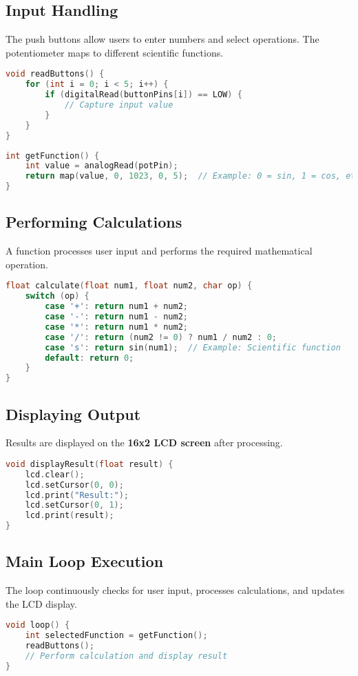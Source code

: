 \documentclass[journal,12pt,onecolumn,article]{IEEEtran}
\theoremstyle{remark}
\begin{document}
\subsection{Input Handling}
The push buttons allow users to enter numbers and select operations. The potentiometer maps to different scientific functions.
\begin{lstlisting}[language=C++, caption=Reading Button Input]
void readButtons() {
    for (int i = 0; i < 5; i++) {
        if (digitalRead(buttonPins[i]) == LOW) {
            // Capture input value
        }
    }
}
\end{lstlisting}

\begin{lstlisting}[language=C++, caption=Mapping Potentiometer Input]
int getFunction() {
    int value = analogRead(potPin);
    return map(value, 0, 1023, 0, 5);  // Example: 0 = sin, 1 = cos, etc.
}
\end{lstlisting}

\subsection{Performing Calculations}
A function processes user input and performs the required mathematical operation.
\begin{lstlisting}[language=C++, caption=Calculation Function]
float calculate(float num1, float num2, char op) {
    switch (op) {
        case '+': return num1 + num2;
        case '-': return num1 - num2;
        case '*': return num1 * num2;
        case '/': return (num2 != 0) ? num1 / num2 : 0;
        case 's': return sin(num1);  // Example: Scientific function
        default: return 0;
    }
}
\end{lstlisting}

\subsection{Displaying Output}
Results are displayed on the \textbf{16x2 LCD screen} after processing.
\begin{lstlisting}[language=C++, caption=LCD Output Display]
void displayResult(float result) {
    lcd.clear();
    lcd.setCursor(0, 0);
    lcd.print("Result:");
    lcd.setCursor(0, 1);
    lcd.print(result);
}
\end{lstlisting}

\subsection{Main Loop Execution}
The loop continuously checks for user input, processes calculations, and updates the LCD display.
\begin{lstlisting}[language=C++, caption=Main Loop Execution]
void loop() {
    int selectedFunction = getFunction();
    readButtons();
    // Perform calculation and display result
}
\end{lstlisting}
\end{document}
